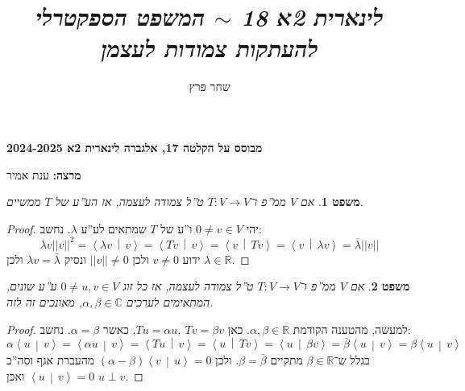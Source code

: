\documentclass[]{article}
\author{שחר פרץ}
\title{\textit{לינארית 2א 18 $\sim$ המשפט הספקטרלי להעתקות צמודות לעצמן}}
\newcommand\R     {\mathbb{R}}
\newcommand\C     {\mathbb{C}}
\newcommand\ra    {\rangle}
\newcommand\la    {\langle}
\newcommand\ol    {\overline}
\newcommand\co        {\colon}
\newcommand\norm[1]   {\left \vert \left \vert #1 \right \vert \right \vert}
\newcommand\mut[2]    {\left \la #1 \,\middle\vert\, #2 \right \ra}
\newcommand\ag        {\alpha}
\newcommand\bg        {\beta}
\renewcommand\lg      {\lambda}
\newtheorem{Theorem}{משפט}
\theoremstyle{definition}
\newcommand\theo  [1] {\begin{Theorem}#1\end{Theorem}}
\begin{document}
	\maketitle
	\textbf{מבוסס על הקלטה 17, אלגברה לינארית 2א 2024-2025}
	
	\textbf{מרצה: }ענת אמיר
	
	\theo{אם $V$ ממ''פ ו־$T \co V \to V$ ט''ל צמודה לעצמה, אז הע''ע של $T$ ממשיים. }\begin{proof}
		יהי $0 \neq v \in V$ ו''ע של $T$ שמתאים לע''ע $\lg$. נחשב: 
		\[ \lg v\norm{v}^2 = \mut{\lg v}{v} = \mut{T v}{v} = \mut{v}{Tv} = \mut{v}{\lg v} = \ol \lg \norm{v} \]
		ידוע $v \neq 0$ ולכן $\norm{v} \neq 0$ ונסיק $\lg v = \bar \lg $ ולכן $\lg \in \R$. 
	\end{proof}
	
	\theo{אם $V$ ממ''פ ו־$T \co V \to V$ ט''ל צמודה לעצמה, אז כל זוג $0 \neq u, v \in V$ ע''ע שונים, המתאימים לערכים $\ag, \bg \in \C$, מאונכים זה לזה. }\begin{proof}
		למעשה, מהטענה הקודמת $\ag, \bg \in \R$. כאן $Tu = \ag u, \ Tv = \bg v$, כאשר $\ag = \bg$. נחשב: 
		\[ \ag \mut{u}{v} = \mut{\ag u}{v} = \mut{Tu}{v} = \mut{u}{Tv} = \mut{u}{\bg v} = \bar \bg \mut{u}{v} = \bg \mut{u}{v} \]
		בגלל ש־$\bg \in \R$ מתקיים $\bg = \bar \bg$. ולכן $(\ag - \bg)\mut{v}{u} = 0$ מהעברת אגף וסה''כ $\mut{u}{v} = 0$ ואכן $u \perp v$. 
	\end{proof}
	
\end{document}
